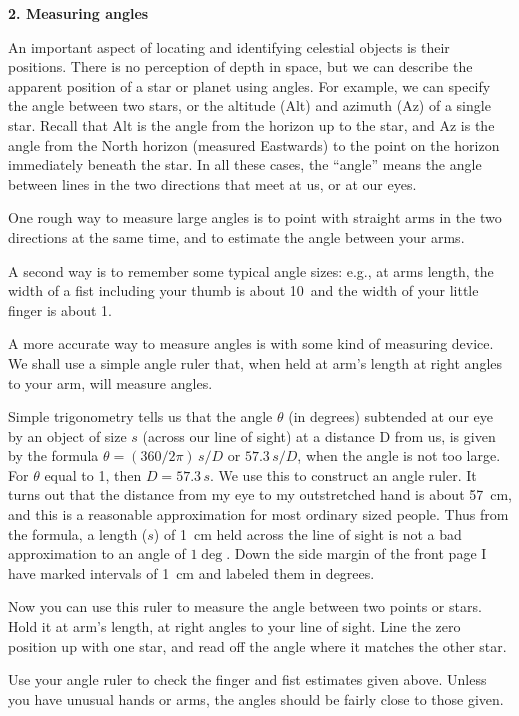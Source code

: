 \bigskip
\noindent
{\bf 2. Measuring angles}

\medskip
\noindent
An important aspect of locating and
identifying celestial objects is their positions. There is no
perception of depth in space, but we can describe the apparent
position of a star or planet using angles. For example, we can specify
the angle between two stars, or the altitude (Alt) and azimuth (Az) of
a single star. Recall that Alt is the angle from the horizon up to the
star, and Az is the angle from the North horizon (measured Eastwards)
to the point on the horizon immediately beneath the star. In all these
cases, the ``angle'' means the angle between lines in the two
directions that meet at us, or at our eyes.

One rough way to measure large angles is to point with straight arms
in the two directions at the same time, and to estimate the angle
between your arms.

A second way is to remember some typical angle sizes: e.g.,  at
arms length, the width of a fist including your thumb is about 10\deg\
and the width of your little finger is about 1\deg.

A more accurate way to measure angles is with some kind of measuring
device. We shall use a simple angle ruler that, when held at arm's
length at right angles to your arm, will measure angles.

Simple trigonometry tells us that the angle $\theta$ (in degrees)
subtended at our eye by an object of size $s$ (across our line of
sight) at a distance D from us, is given by the formula $\theta =
(360/2\pi)\,s/D$ or $57.3\, s/D$, when the angle is not too large.
For $\theta$ equal to 1\deg, then $D = 57.3\, s$.  We use this to
construct an angle ruler.  It turns out that the distance from my eye
to my outstretched hand is about 57~cm, and this is a reasonable approximation
for most ordinary sized people. Thus from the formula, a length ($s$) of
1~cm held across the line of sight is not a bad approximation to an
angle of $1\deg$.  Down the side margin of the front page I have
marked intervals of 1~cm and labeled them in degrees.

Now you can use this ruler to measure the angle between two points or
stars. Hold it at arm's length, at right angles to your line of
sight. Line the zero position up with one star, and read off the angle
where it matches the other star.

Use your angle ruler to check the finger and fist estimates given
above. Unless you have unusual hands or arms, the angles should be
fairly close to those given.

